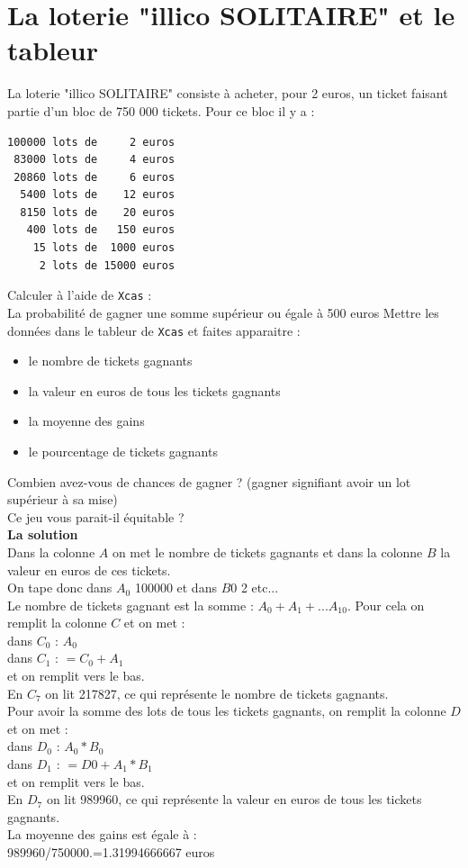 \documentclass[a4paper,11pt]{book}
\begin{document}
\section{La loterie "illico SOLITAIRE" et le tableur}
La loterie "illico SOLITAIRE" consiste \`a acheter, pour 2 euros, un ticket 
faisant partie d'un bloc de 750 000 tickets. Pour ce bloc il y a :
\begin{verbatim}
100000 lots de     2 euros
 83000 lots de     4 euros
 20860 lots de     6 euros
  5400 lots de    12 euros
  8150 lots de    20 euros
   400 lots de   150 euros
    15 lots de  1000 euros
     2 lots de 15000 euros
\end{verbatim}
Calculer \`a l'aide  de {\tt Xcas} :\\
La probabilit\'e de gagner une somme sup\'erieur ou \'egale \`a 500 euros 
Mettre les donn\'ees dans le tableur de {\tt Xcas} et faites apparaitre :
\begin{itemize}
\item le nombre de tickets gagnants
\item la valeur en euros de tous les tickets gagnants
\item la moyenne des gains
\item le pourcentage de tickets gagnants
\end{itemize}
Combien avez-vous de chances de gagner ? (gagner signifiant avoir un lot 
sup\'erieur \`a sa mise)\\
Ce jeu vous parait-il \'equitable ?\\

{\bf La solution}\\
Dans la colonne $A$ on met le nombre de tickets gagnants et dans 
la colonne $B$ la valeur en euros de ces tickets.\\
On tape donc dans $A_0$ 100000 et dans $B0$ 2 etc...\\ 
Le nombre de tickets gagnant est la somme : $A_0+A_1+... A_{10}$.
Pour cela on remplit la colonne $C$ et on met :\\
dans $C_0$ : $A_0$\\
dans $C_1$ : $=C_0+A_1$\\
et on remplit vers le bas.\\
En $C_7$ on lit 217827, ce qui repr\'esente le nombre de tickets gagnants.\\

Pour avoir la somme des lots de tous les tickets gagnants, on remplit la 
colonne $D$  et on met :\\
dans $D_0$ : $A_0*B_0$\\
dans $D_1$ : $=D0+A_1*B_1$\\
et on remplit vers le bas.\\
En $D_7$ on lit 989960, ce qui repr\'esente la valeur en euros de tous les 
tickets gagnants.\\
La moyenne des gains est \'egale \`a : \\
989960/750000.=1.31994666667 euros\\
\end{document}
